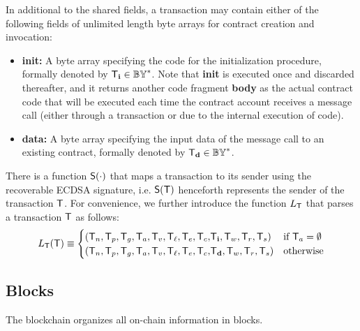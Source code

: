 \smallskip
In additional to the shared fields, 
a transaction may contain either of the following fields of unlimited length byte arrays for contract creation and invocation:
\begin{itemize}[nosep]
 	\item {\bf init:} A byte array specifying the \cvm code for the initialization procedure, formally denoted by $\textsf{T}_{\bf i} \in \mathbb{BY}^*$.
 	Note that {\bf init} is executed once and discarded thereafter, and it returns another code fragment {\bf body} as the actual contract code that will be executed each time the contract account receives a message call (either through a transaction or due to the internal execution of code).


 	\item {\bf data:} A byte array specifying the input data of the message call to an existing contract, formally denoted by $\textsf{T}_{\bf d}\in \mathbb{BY}^*$.

 \end{itemize} 

There is a function $\mathsf{S}{\left({\cdot} \right)}$ that maps a transaction to its sender using the recoverable ECDSA signature,
i.e. $\mathsf{S}{\left({\textsf{T}} \right)}$ henceforth represents the sender of the transaction $\textsf{T}$.
% 
For convenience, we further introduce the function $L_{\textsf{T}}$ that parses a transaction $\textsf{T}$ as follows:
\begin{align}\label{def:tx_prepare}
	L_{\textsf{T}}(\textsf{T})\equiv 
	\begin{cases}
	\left(\textsf{T}_n, \textsf{T}_p, \textsf{T}_g, \textsf{T}_a, \textsf{T}_v, {\textsf{T}_\ell,\textsf{T}_e,\textsf{T}_c,} \textsf{T}_{\bf i}, \textsf{T}_w,\textsf{T}_r,\textsf{T}_s \right) & \mbox{if $\textsf{T}_a=\emptyset$} \\
	\left(\textsf{T}_n, \textsf{T}_p, \textsf{T}_g, \textsf{T}_a, \textsf{T}_v, {\textsf{T}_\ell,\textsf{T}_e,\textsf{T}_c,} \textsf{T}_{\bf d}, \textsf{T}_w,\textsf{T}_r,\textsf{T}_s \right) & \mbox{otherwise}
	\end{cases}
\end{align}


\subsection{Blocks}
\label{sec:block}

The {\name} blockchain organizes all on-chain information in blocks.

